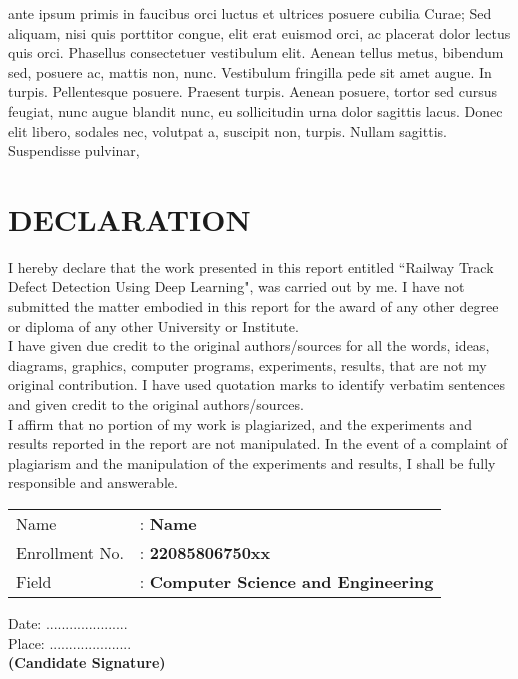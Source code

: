 \documentclass[a4paper, 12pt]{report}
\begin{document}
\begin{singlespace}
ante ipsum primis in faucibus orci luctus et ultrices posuere cubilia Curae; Sed aliquam, nisi quis porttitor congue, elit erat euismod orci, ac placerat dolor lectus quis orci. Phasellus consectetuer vestibulum elit. Aenean tellus metus, bibendum sed, posuere ac, mattis non, nunc. Vestibulum fringilla pede sit amet augue. In turpis. Pellentesque posuere. Praesent turpis. Aenean posuere, tortor sed cursus feugiat, nunc augue blandit nunc, eu sollicitudin urna dolor sagittis lacus. Donec elit libero, sodales nec, volutpat a, suscipit non, turpis. Nullam sagittis. Suspendisse pulvinar, 
				
				
			\end{singlespace}
			
			    \chapter*{\fontsize{14}{17}\selectfont \centering DECLARATION}
			
			\begin{doublespace}
				I hereby declare that the work presented in this report entitled “Railway Track Defect Detection Using Deep Learning",
				was carried out by me. I have not submitted the matter embodied in this report for
				the award of any other degree or diploma of any other University or Institute.\\
				I have given due credit to the original authors/sources for all the words, ideas,
				diagrams, graphics, computer programs, experiments, results, that are not my
				original contribution. I have used quotation marks to identify verbatim sentences
				and given credit to the original authors/sources.\\
				I affirm that no portion of my work is plagiarized, and the experiments and
				results reported in the report are not manipulated. In the event of a complaint of
				plagiarism and the manipulation of the experiments and results, I shall be fully
				responsible and answerable.\\[1cm]
				
				\raggedright %
				
				\begin{tabular}{ l l }
					Name & : \textbf{Name}\\ 
					Enrollment No. & : \textbf{ 22085806750xx}\\  
					Field & : \textbf{ Computer Science and Engineering}\\
				\end{tabular}
				
				\vspace{2cm}
				Date:  .....................\\
				Place: .....................\\
				\vspace{1.5cm}
				\textbf{(Candidate Signature)}
			\end{doublespace}
			
\end{document}
